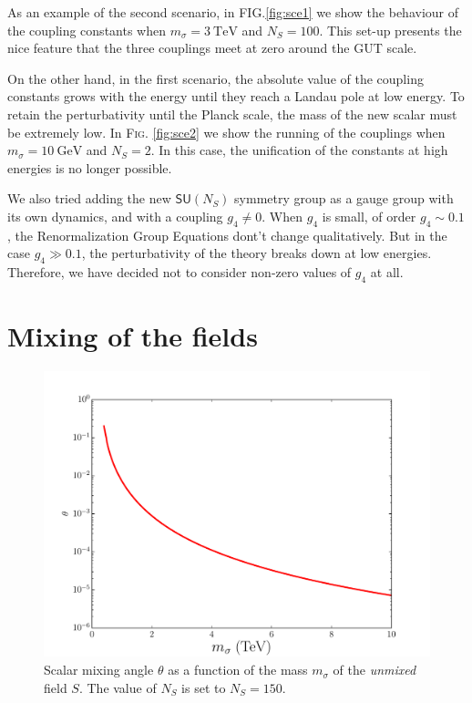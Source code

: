 \documentclass[aps,prd,preprintnumbers,nofootinbibn,twocolumn]{revtex4}
\begin{document}
As an example of the second scenario, in \textsc{FIG.}\ref{fig:sce1} we show the behaviour of the coupling constants when $m_\sigma = \SI{3}{\tera\electronvolt}$ and $N_S = 100$. This set-up presents the nice feature that the three couplings meet at zero around the GUT scale. 



On the other hand, in the first scenario, the absolute value of the coupling constants grows with the energy until they reach a Landau pole at low energy. To retain the perturbativity until the Planck scale, the mass of the new scalar must be extremely low. In \textsc{Fig.} \ref{fig:sce2} we show the running of the couplings when $m_\sigma =\SI{10}{\giga\electronvolt}$ and $N_S = 2$. In this case, the unification of the constants at high energies is no longer possible. 




We also tried adding the new $\mathsf{SU}(N_S)$ symmetry group as a gauge group with its own dynamics, and with a coupling $g_4\neq 0$. When $g_4$ is small, of order $g_4\sim 0.1$, the Renormalization Group Equations dont't change qualitatively. But in the case $g_4 \gg 0.1$, the perturbativity of the theory breaks down at low energies. Therefore, we have decided not to consider non-zero values of $g_4$ at all.

\section{Mixing of the fields} \label{sec:mixing}
\begin{figure}[t]
\centering
\includegraphics[width=\columnwidth]{angle}
\caption{Scalar mixing angle $\theta$ as a function of the mass $m_\sigma$ of the \textit{unmixed} field $S$. The value of $N_S$ is set to $N_S=150$.}\label{fig:angle}
\end{figure}
\end{document}
